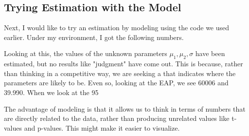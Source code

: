 \documentclass{ltjsbook}
\begin{document}
\subsection{Trying Estimation with the Model}
Next, I would like to try an estimation by modeling using the code we used earlier. Under my environment, I got the following numbers.


Looking at this, the values of the unknown parameters $\mu_1, \mu_2, \sigma$ have been estimated, but no results like "judgment" have come out. This is because, rather than thinking in a competitive way, we are seeking a  that indicates where the parameters are likely to be.
Even so, looking at the EAP, we see 60006 and 39.990. When we look at the 95%

The advantage of modeling is that it allows us to think in terms of numbers that are directly related to the data, rather than producing unrelated values like t-values and p-values. This might make it easier to visualize.
\end{document}
